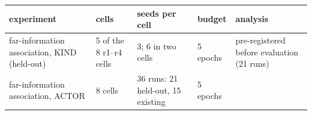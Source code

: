 \documentclass[10pt]{article}
\begin{document}
\begin{longtable}[]{@{}lllll@{}}
\toprule
\begin{minipage}[b]{0.17\columnwidth}\raggedright
experiment\strut
\end{minipage} & \begin{minipage}[b]{0.17\columnwidth}\raggedright
cells\strut
\end{minipage} & \begin{minipage}[b]{0.17\columnwidth}\raggedright
seeds per cell\strut
\end{minipage} & \begin{minipage}[b]{0.17\columnwidth}\raggedright
budget\strut
\end{minipage} & \begin{minipage}[b]{0.17\columnwidth}\raggedright
analysis\strut
\end{minipage}\tabularnewline
\midrule
\endhead
\begin{minipage}[t]{0.17\columnwidth}\raggedright
far-information association, KIND (held-out)\strut
\end{minipage} & \begin{minipage}[t]{0.17\columnwidth}\raggedright
5 of the 8 r1--r4 cells\strut
\end{minipage} & \begin{minipage}[t]{0.17\columnwidth}\raggedright
3; 6 in two cells\strut
\end{minipage} & \begin{minipage}[t]{0.17\columnwidth}\raggedright
5 epochs\strut
\end{minipage} & \begin{minipage}[t]{0.17\columnwidth}\raggedright
pre-registered before evaluation (21 runs)\strut
\end{minipage}\tabularnewline
\begin{minipage}[t]{0.17\columnwidth}\raggedright
far-information association, ACTOR\strut
\end{minipage} & \begin{minipage}[t]{0.17\columnwidth}\raggedright
8 cells\strut
\end{minipage} & \begin{minipage}[t]{0.17\columnwidth}\raggedright
36 runs: 21 held-out, 15 existing\strut
\end{minipage} & \begin{minipage}[t]{0.17\columnwidth}\raggedright
5 epochs\strut
\end{minipage} & \begin{minipage}[t]{0.17\columnwidth}\raggedright

\end{minipage}
\end{longtable}
\end{document}

